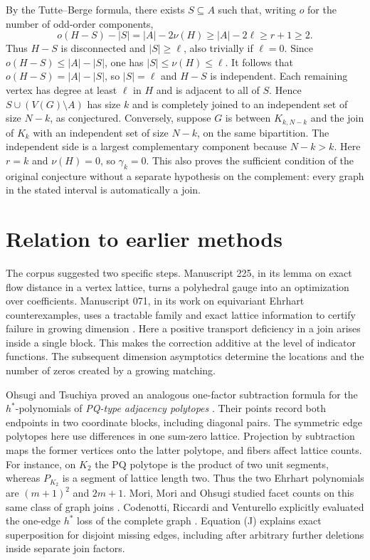 \documentclass[11pt,a4paper]{article}
\theoremstyle{definition}\newtheorem{problem}[theorem]{Problem}
\begin{document}
By the Tutte--Berge formula, there exists $S\subseteq A$ such that, writing $o$ for the number of odd-order components,
\[
 o(H-S)-|S|=|A|-2\nu(H)\ge |A|-2\ell\ge r+1\ge2.
\]
Thus $H-S$ is disconnected and $|S|\ge\ell$, also trivially if $\ell=0$. Since $o(H-S)\le |A|-|S|$, one has $|S|\le \nu(H)\le\ell$. It follows that $o(H-S)=|A|-|S|$, so $|S|=\ell$ and $H-S$ is independent. Each remaining vertex has degree at least $\ell$ in $H$ and is adjacent to all of $S$. Hence $S\cup(V(G)\setminus A)$ has size $k$ and is completely joined to an independent set of size $N-k$, as conjectured. Conversely, suppose $G$ is between $K_{k,N-k}$ and the join of $K_k$ with an independent set of size $N-k$, on the same bipartition. The independent side is a largest complementary component because $N-k>k$. Here $r=k$ and $\nu(H)=0$, so $\gamma_k=0$. This also proves the sufficient condition of the original conjecture without a separate hypothesis on the complement: every graph in the stated interval is automatically a join.

\section{Relation to earlier methods}
The corpus suggested two specific steps. Manuscript 225, in its lemma on exact flow distance in a vertex lattice, turns a polyhedral gauge into an optimization over coefficients. Manuscript 071, in its work on equivariant Ehrhart counterexamples, uses a tractable family and exact lattice information to certify failure in growing dimension \cite{Corpus}. Here a positive transport deficiency in a join arises inside a single block. This makes the correction additive at the level of indicator functions. The subsequent dimension asymptotics determine the locations and the number of zeros created by a growing matching.

Ohsugi and Tsuchiya proved an analogous one-factor subtraction formula for the $h^*$-polynomials of \emph{PQ-type adjacency polytopes} \cite[Theorem~1.1]{PQ}. Their points record both endpoints in two coordinate blocks, including diagonal pairs. The symmetric edge polytopes here use differences in one sum-zero lattice. Projection by subtraction maps the former vertices onto the latter polytope, and fibers affect lattice counts. For instance, on $K_2$ the PQ polytope is the product of two unit segments, whereas $P_{K_2}$ is a segment of lattice length two. Thus the two Ehrhart polynomials are $(m+1)^2$ and $2m+1$. Mori, Mori and Ohsugi studied facet counts on this same class of graph joins \cite{MMO}. Codenotti, Riccardi and Venturello explicitly evaluated the one-edge $h^*$ loss of the complete graph \cite[Example~5.7]{CRV}. Equation (J) explains exact superposition for disjoint missing edges, including after arbitrary further deletions inside separate join factors.
\end{document}
